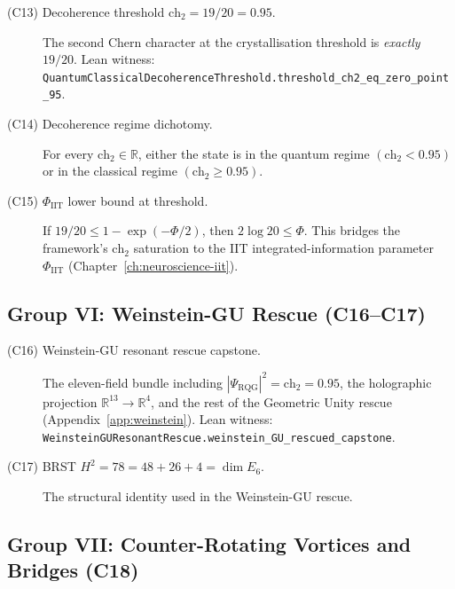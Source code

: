\begin{description}
\item[\textnormal{(C13) Decoherence threshold $\text{ch}_2 = 19/20 = 0.95$.}]
The second Chern character at the crystallisation threshold is
\emph{exactly} $19/20$. Lean witness:
\texttt{Quantum\allowbreak{}Classical\allowbreak{}Decoherence\allowbreak{}Threshold.threshold\_\allowbreak{}ch2\_\allowbreak{}eq\_\allowbreak{}zero\_\allowbreak{}point\_\allowbreak{}95}.

\item[\textnormal{(C14) Decoherence regime dichotomy.}]
For every $\text{ch}_2 \in \mathbb{R}$, either the state is
in the quantum regime $(\text{ch}_2 < 0.95)$ or in the
classical regime $(\text{ch}_2 \ge 0.95)$.

\item[\textnormal{(C15) $\Phi_{\text{IIT}}$ lower bound at threshold.}]
If $19/20 \le 1 - \exp(-\Phi/2)$, then $2 \log 20 \le \Phi$.
This bridges the framework's $\text{ch}_2$ saturation to the
IIT integrated-information parameter $\Phi_{\text{IIT}}$
(Chapter~\ref{ch:neuroscience-iit}).
\end{description}

\subsection{Group VI: Weinstein-GU Rescue (C16--C17)}
\label{subsec:substrate-consequences-weinstein}

\begin{description}
\item[\textnormal{(C16) Weinstein-GU resonant rescue capstone.}]
The eleven-field bundle including
$|\Psi_{\text{RQG}}|^2 = \text{ch}_2 = 0.95$, the holographic
projection $\mathbb{R}^{13} \to \mathbb{R}^4$, and the rest
of the Geometric Unity rescue (Appendix~\ref{app:weinstein}).
Lean witness:
\texttt{Weinstein\allowbreak{}GUResonant\allowbreak{}Rescue.weinstein\_\allowbreak{}GU\_\allowbreak{}rescued\_\allowbreak{}capstone}.

\item[\textnormal{(C17) BRST $H^2 = 78 = 48 + 26 + 4 = \dim E_6$.}]
The structural identity used in the Weinstein-GU rescue.
\end{description}

\subsection{Group VII: Counter-Rotating Vortices and Bridges (C18)}
\label{subsec:substrate-consequences-vortices}

